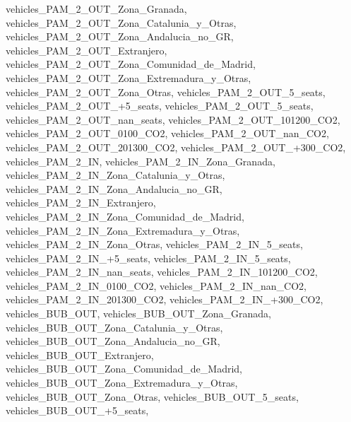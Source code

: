 \documentclass[letterpaper,10pt,english]{sphinxmanual}
\begin{document}
\begin{fulllineitems}
\textquotesingle{}vehicles\_PAM\_2\_OUT\_Zona\_Granada\textquotesingle{}, \textquotesingle{}vehicles\_PAM\_2\_OUT\_Zona\_Catalunia\_y\_Otras\textquotesingle{}, \textquotesingle{}vehicles\_PAM\_2\_OUT\_Zona\_Andalucia\_no\_GR\textquotesingle{}, \textquotesingle{}vehicles\_PAM\_2\_OUT\_Extranjero\textquotesingle{}, \textquotesingle{}vehicles\_PAM\_2\_OUT\_Zona\_Comunidad\_de\_Madrid\textquotesingle{}, \textquotesingle{}vehicles\_PAM\_2\_OUT\_Zona\_Extremadura\_y\_Otras\textquotesingle{}, \textquotesingle{}vehicles\_PAM\_2\_OUT\_Zona\_Otras\textquotesingle{}, \textquotesingle{}vehicles\_PAM\_2\_OUT\_5\_seats\textquotesingle{}, \textquotesingle{}vehicles\_PAM\_2\_OUT\_+5\_seats\textquotesingle{}, \textquotesingle{}vehicles\_PAM\_2\_OUT\_\sphinxhyphen{}5\_seats\textquotesingle{}, \textquotesingle{}vehicles\_PAM\_2\_OUT\_nan\_seats\textquotesingle{}, \textquotesingle{}vehicles\_PAM\_2\_OUT\_101\sphinxhyphen{}200\_CO2\textquotesingle{}, \textquotesingle{}vehicles\_PAM\_2\_OUT\_0\sphinxhyphen{}100\_CO2\textquotesingle{}, \textquotesingle{}vehicles\_PAM\_2\_OUT\_nan\_CO2\textquotesingle{}, \textquotesingle{}vehicles\_PAM\_2\_OUT\_201\sphinxhyphen{}300\_CO2\textquotesingle{}, \textquotesingle{}vehicles\_PAM\_2\_OUT\_+300\_CO2\textquotesingle{}, \textquotesingle{}vehicles\_PAM\_2\_IN\textquotesingle{}, \textquotesingle{}vehicles\_PAM\_2\_IN\_Zona\_Granada\textquotesingle{}, \textquotesingle{}vehicles\_PAM\_2\_IN\_Zona\_Catalunia\_y\_Otras\textquotesingle{}, \textquotesingle{}vehicles\_PAM\_2\_IN\_Zona\_Andalucia\_no\_GR\textquotesingle{}, \textquotesingle{}vehicles\_PAM\_2\_IN\_Extranjero\textquotesingle{}, \textquotesingle{}vehicles\_PAM\_2\_IN\_Zona\_Comunidad\_de\_Madrid\textquotesingle{}, \textquotesingle{}vehicles\_PAM\_2\_IN\_Zona\_Extremadura\_y\_Otras\textquotesingle{}, \textquotesingle{}vehicles\_PAM\_2\_IN\_Zona\_Otras\textquotesingle{}, \textquotesingle{}vehicles\_PAM\_2\_IN\_5\_seats\textquotesingle{}, \textquotesingle{}vehicles\_PAM\_2\_IN\_+5\_seats\textquotesingle{}, \textquotesingle{}vehicles\_PAM\_2\_IN\_\sphinxhyphen{}5\_seats\textquotesingle{}, \textquotesingle{}vehicles\_PAM\_2\_IN\_nan\_seats\textquotesingle{}, \textquotesingle{}vehicles\_PAM\_2\_IN\_101\sphinxhyphen{}200\_CO2\textquotesingle{}, \textquotesingle{}vehicles\_PAM\_2\_IN\_0\sphinxhyphen{}100\_CO2\textquotesingle{}, \textquotesingle{}vehicles\_PAM\_2\_IN\_nan\_CO2\textquotesingle{}, \textquotesingle{}vehicles\_PAM\_2\_IN\_201\sphinxhyphen{}300\_CO2\textquotesingle{}, \textquotesingle{}vehicles\_PAM\_2\_IN\_+300\_CO2\textquotesingle{}, \textquotesingle{}vehicles\_BUB\_OUT\textquotesingle{}, \textquotesingle{}vehicles\_BUB\_OUT\_Zona\_Granada\textquotesingle{}, \textquotesingle{}vehicles\_BUB\_OUT\_Zona\_Catalunia\_y\_Otras\textquotesingle{}, \textquotesingle{}vehicles\_BUB\_OUT\_Zona\_Andalucia\_no\_GR\textquotesingle{}, \textquotesingle{}vehicles\_BUB\_OUT\_Extranjero\textquotesingle{}, \textquotesingle{}vehicles\_BUB\_OUT\_Zona\_Comunidad\_de\_Madrid\textquotesingle{}, \textquotesingle{}vehicles\_BUB\_OUT\_Zona\_Extremadura\_y\_Otras\textquotesingle{}, \textquotesingle{}vehicles\_BUB\_OUT\_Zona\_Otras\textquotesingle{}, \textquotesingle{}vehicles\_BUB\_OUT\_5\_seats\textquotesingle{}, \textquotesingle{}vehicles\_BUB\_OUT\_+5\_seats\textquotesingle{}, 
\end{fulllineitems}
\end{document}
